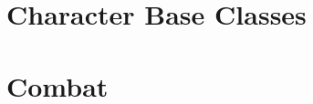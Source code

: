 \documentclass[10pt,oneside]{report}
\newcommand{\itemspace}{\setlength{\itemsep}{-1mm}\setlength{\topsep}{-1mm} }
\begin{document}
\linespread{.9}  \small  \normalsize \itemspace

\chapter{Character Base Classes}




























\chapter{Combat}


\end{document}
